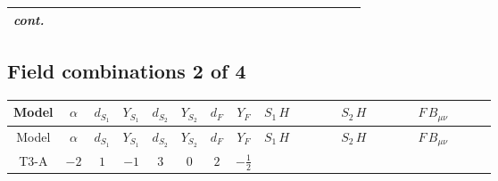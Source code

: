 \documentclass[8pt]{article}
\begin{document}
\begin{landscape}
\begin{longtable}{@{}cccccccc >{\raggedright\arraybackslash}p{0.21\linewidth} >{\raggedright\arraybackslash}p{0.21\linewidth} >{\raggedright\arraybackslash}p{0.21\linewidth}@{}}
\textit{cont.} &  &  &  &  &  &  &  & \scriptsize\adjustbox{max width=\linewidth}{$\begin{gathered} -\frac{2 \hbar  \log \left(\frac{\bar{\mu}^{2}}{m_2^2}\right) \overline{\lambda_5} H_{a_1} H_{a_2} m_2^2 \lambda_5 H_{a_1}{}^{\dagger } H_{a_2}{}^{\dagger }}{\sqrt{3} \left(m_1^2-m_2^2\right)} \\ +\hbar  C_{\text{H2}} H_{a_2} H_{a_1}{}^{\dagger } \mathcal{I}_{H1,a_1,a_2}{}^1\end{gathered}$} &  &  \\
\midrule
\bottomrule
\end{longtable}
\clearpage
\subsection*{Field combinations 2 of 4}
\begin{longtable}{@{}cccccccc >{\raggedright\arraybackslash}p{0.21\linewidth} >{\raggedright\arraybackslash}p{0.21\linewidth} >{\raggedright\arraybackslash}p{0.21\linewidth}@{}}
\toprule
Model & $\alpha$ & $d_{S_1}$ & $Y_{S_1}$ & $d_{S_2}$ & $Y_{S_2}$ & $d_F$ & $Y_F$ & $S_1\,H$ & $S_2\,H$ & $F\,B_{\mu\nu}$ \\
\midrule
\endfirsthead
\toprule
Model & $\alpha$ & $d_{S_1}$ & $Y_{S_1}$ & $d_{S_2}$ & $Y_{S_2}$ & $d_F$ & $Y_F$ & $S_1\,H$ & $S_2\,H$ & $F\,B_{\mu\nu}$ \\
\midrule
\endhead
T3-A & $-2$ & $1$ & $-1$ & $3$ & $0$ & $2$ & $-\frac{1}{2}$ & \scriptsize\adjustbox{max width=\linewidth}{$\begin{gathered} +\frac{\hbar  H_{a_3} H_{a_4} H_{a_1}{}^{\dagger } H_{a_2}{}^{\dagger } \mathcal{I}_{H1,a_1,a_3}{}^1 \mathcal{I}_{H1,a_2,a_4}{}^1 \left(\lambda_{HS_1}^{(1)}^{(1)}\right){}^2}{2 \epsilon } \\ +\frac{1}{2} \hbar  \log \left(\frac{\bar{\mu}^{2}}{m_1^2}\right) H_{a_3} H_{a_4} H_{a_1}{}^{\dagger } H_{a_2}{}^{\dagger } \mathcal{I}_{H1,a_1,a_3}{}^1 \mathcal{I}_{H1,a_2,a_4}{}^1 \left(\lambda_{HS_1}^{(1)}^{(1)}\right){}^2\end{gathered}$} & \scriptsize\adjustbox{max width=\linewidth}{$\begin{gathered} +\frac{3 \hbar  H_{a_1} H_{a_2} H_{a_1}{}^{\dagger } H_{a_2}{}^{\dagger } \left(\lambda_{HS_2}^{(1)}^{(2)}\right){}^2}{2 \epsilon } \\ +\frac{3}{2} \hbar  \log \left(\frac{\bar{\mu}^{2}}{m_2^2}\right) H_{a_1} H_{a_2} H_{a_1}{}^{\dagger } H_{a_2}{}^{\dagger } \left(\lambda_{HS_2}^{(1)}^{(2)}\right){}^2\end{gathered}$} & \scriptsize\adjustbox{max width=\linewidth}{$\begin{gathered} -\frac{1}{2} \hbar  \log \left(\frac{\bar{\mu}^{2}}{M_F^2}\right) B_{\mu _1\mu _2}^2\end{gathered}$} \\
\midrule
\bottomrule
\end{longtable}
\clearpage

\end{landscape}
\end{document}

